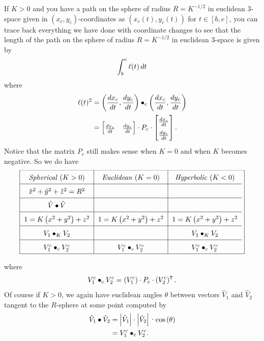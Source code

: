 \documentclass{ximera}
\begin{document}
If $K>0$ and you have a path on the sphere of radius $R=K^{-1/2}$ in
euclidean $3$-space given in $\left( x_{c},y_{c}\right) $-coordinates
as $\left( x_{c}\left( t\right) ,y_{c}\left( t\right) \right) $ for
$t\in\left[ b,e\right] $, you can trace back everything we have done
with coordinate changes to see that the length of the path on the
sphere of radius $R=K^{-1/2}$ in euclidean $3$-space is given by%
\[
\int_{b}^{e}\ell(t)\,d t
\]
where%
\begin{align*}
\l(t)  ^{2}  &  =\left(  \frac{dx_{c}}{dt},\frac{dy_{c}}%
{dt}\right)  \bullet_{c}\left(  \frac{dx_{c}}{dt},\frac{dy_{c}}{dt}\right) \\
&  =
\begin{bmatrix}
\frac{dx_{c}}{dt} & \frac{dy_{c}}{dt}%
\end{bmatrix} \cdot P_{c}\cdot\begin{bmatrix}
\frac{dx_{c}}{dt}\\
\frac{dy_{c}}{dt}%
\end{bmatrix} .
\end{align*}
Notice that the matrix $P_{c}$ still makes sense when $K=0$ and when $K$
becomes negative. So we do have%
\[{\renewcommand{\arraystretch}{1.6}
\frame{%
\begin{tabular}
[c]{c|c|c}%
\textit{Spherical} ($K>0$) & \textit{Euclidean} ($K=0$) & \textit{Hyperbolic}
($K<0$)\\\hline
$\hat{x}^{2}+\hat{y}^{2}+\hat{z}^{2}=R^{2}$ &  & \\ \hline
$\hat{V}\bullet\hat{V}$ &  & \\ \hline
$1=K\left(  x^{2}+y^{2}\right)  +z^{2}$ & $1=K\left(  x^{2}+y^{2}\right)
+z^{2}$ & $1=K\left(  x^{2}+y^{2}\right)  +z^{2}$\\ \hline
$V_{1}\bullet_{K}V_{2}$ &  & $V_{1}\bullet_{K}V_{2}$\\ \hline
$V_{1}^{c}\bullet_{c}V_{2}^{c}$ & $V_{1}^{c}\bullet_{c}V_{2}^{c}$ & $V_{1}%
^{c}\bullet_{c}V_{2}^{c}$%
\end{tabular}
}}
\]
where%
\[
V_{1}^{c}\bullet_{c}V_{2}^{c}=\left(  V_{1}^{c}\right)  \cdot P_{c}%
\cdot\left(  V_{2}^{c}\right)  ^\transpose.
\]
Of course if $K>0$, we again have euclidean angles $\theta$ between vectors
$\hat{V}_{1}$ and $\hat{V}_{2}$ tangent to the $R$-sphere at some point
computed by%
\begin{align*}
\hat{V}_{1}\bullet\hat{V}_{2}  &  =\left\vert \hat{V}_{1}\right\vert
\cdot\left\vert \hat{V}_{2}\right\vert
\text{\textperiodcentered\textrm{cos}}\left(  \theta\right) \\
&  =V_{1}^{c}\bullet_{c}V_{2}^{c}.
\end{align*}
\end{document}
